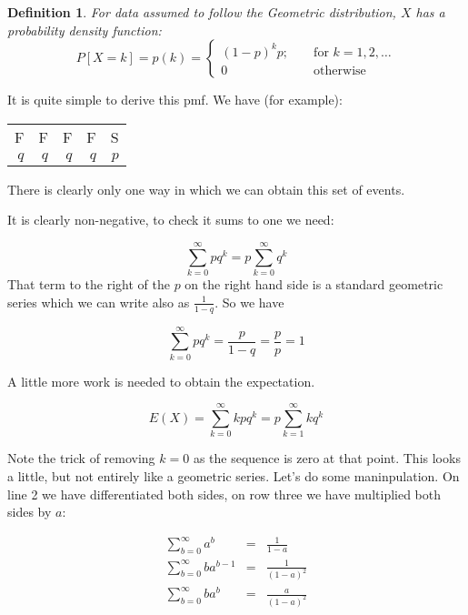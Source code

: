 \documentclass[12pt]{extbook}
\newtheorem{df}{Definition}[section]
\begin{document}
\begin{df}
For data assumed to follow the Geometric distribution, $X$ has a probability density function:
\begin{displaymath}
P[X=k] = p(k) =  \left\{ \begin{array}{crr} (1-p)^{k}p; & & \mbox{ for } k=1,2,\ldots\\
0 & & \mbox{ otherwise } \end{array} \right.
\end{displaymath}
\end{df}



It is quite simple to derive this pmf.   We have (for example):
\begin{tabular}{rrrrr}
F & F & F & F & S \\
$q$ & $q$ & $q$ & $q$ & $p$
\end{tabular}

There is clearly only one way in which we can obtain this set of events.

It is clearly non-negative, to check it sums to one we need:

\begin{displaymath}
\sum_{k=0}^{\infty} pq^k = p \sum_{k=0}^{\infty} q^k
\end{displaymath}
That term to the right of the $p$ on the right hand side is a standard geometric series which we can write also as $\frac{1}{1-q}$.   So we have 


\begin{displaymath}
\sum_{k=0}^{\infty} pq^k = \frac{p}{1-q} = \frac{p}{p} = 1
\end{displaymath}


A little more work is needed to obtain the expectation.

\begin{displaymath}
E(X) = \sum_{k=0}^{\infty} k p q^k =  p \sum_{k=1}^{\infty} k q^k
\end{displaymath}

Note the trick of removing $k=0$ as the sequence is zero at that point.   This looks a little, but not entirely like a geometric series.   Let's do some maninpulation.  On line 2 we have differentiated both sides, on row three we have multiplied both sides by $a$:

\begin{eqnarray*}
\sum_{b=0}^{\infty} a^b &=& \frac{1}{1-a} \\
\sum_{b=0}^{\infty} b a^{b-1} &=& \frac{1}{(1-a)^2} \\
\sum_{b=0}^{\infty} b a^{b} &=& \frac{a}{(1-a)^2} \\
\end{eqnarray*}
\end{document}

